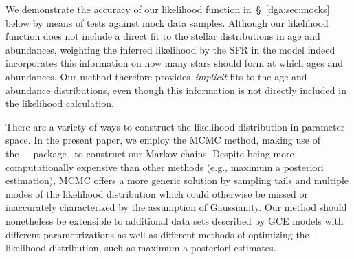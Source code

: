 We demonstrate the accuracy of our likelihood function in~\S~\ref{dga:sec:mocks}
below by means of tests against mock data samples.
Although our likelihood function does not include a direct fit to the
stellar distributions in age and abundances, weighting the inferred likelihood
by the SFR in the model indeed incorporates this information on how many stars
should form at which ages and abundances.
Our method therefore provides~\textit{implicit} fits to the age and abundance
distributions, even though this information is not directly included in the
likelihood calculation.
\par
There are a variety of ways to construct the likelihood distribution in
parameter space.
In the present paper, we employ the MCMC method, making use of
the~\mc~\python~package~\citep{ForemanMackey2013} to construct our Markov
chains.
Despite being more computationally expensive than other methods (e.g.,
maximum a posteriori estimation), MCMC offers a more generic solution by
sampling tails and multiple modes of the likelihood distribution which could
otherwise be missed or inaccurately characterized by the assumption of
Gaussianity.
Our method should nonetheless be extensible to additional data sets described
by GCE models with different parametrizations as well as different methods of
optimizing the likelihood distribution, such as maximum a posteriori estimates.

